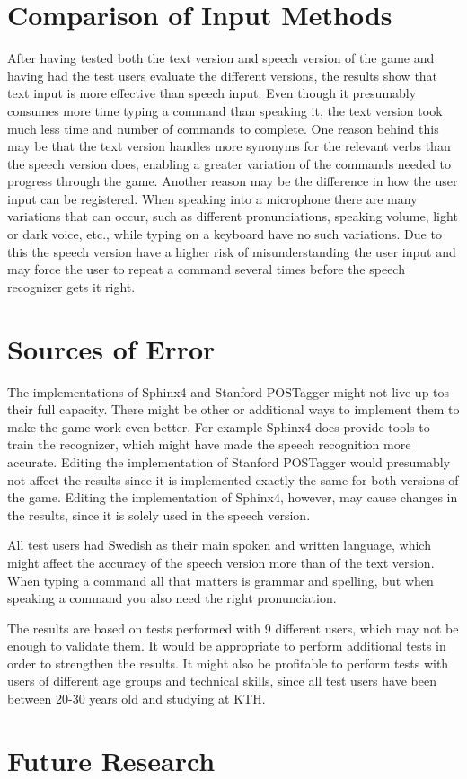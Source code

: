 \section{Comparison of Input Methods} %
After having tested both the text version and speech version of the game and having had the test users evaluate the different versions, the results show that text input is more effective than speech input. Even though it presumably consumes more time typing a command than speaking it, the text version took much less time and number of commands to complete. One reason behind this may be that the text version handles more synonyms for the relevant verbs than the speech version does, enabling a greater variation of the commands needed to progress through the game. Another reason may be the difference in how the user input can be registered. When speaking into a microphone there are many variations that can occur, such as different pronunciations, speaking volume, light or dark voice, etc., while typing on a keyboard have no such variations. Due to this the speech version have a higher risk of misunderstanding the user input and may force the user to repeat a command several times before the speech recognizer gets it right.

\section{Sources of Error} %
The implementations of Sphinx4 and Stanford POSTagger might not live up tos their full capacity. There might be other or additional ways to implement them to make the game work even better. For example Sphinx4 does provide tools to train the recognizer, which might have made the speech recognition more accurate. Editing the implementation of Stanford POSTagger would presumably not affect the results since it is implemented exactly the same for both versions of the game. Editing the implementation of Sphinx4, however, may cause changes in the results, since it is solely used in the speech version.

All test users had Swedish as their main spoken and written language, which might affect the accuracy of the speech version more than of the text version. When typing a command all that matters is grammar and spelling, but when speaking a command you also need the right pronunciation.

The results are based on tests performed with 9 different users, which may not be enough to validate them. It would be appropriate to perform additional tests in order to strengthen the results. It might also be profitable to perform tests with users of different age groups and technical skills, since all test users have been between 20-30 years old and studying at KTH.

\section{Future Research}